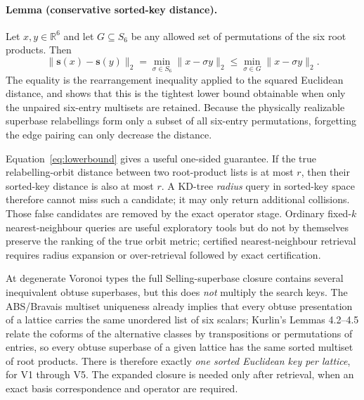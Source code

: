 \documentclass[11pt]{article}
\newcommand{\sortkey}{\mathbf{s}}
\begin{document}
\paragraph{Lemma (conservative sorted-key distance).}
Let $x,y\in\mathbb R^6$ and let $G\subseteq S_6$ be any allowed set of permutations of the six root products. Then
\begin{equation}
\label{eq:lowerbound}
\|\sortkey(x)-\sortkey(y)\|_2
=\min_{\sigma\in S_6}\|x-\sigma y\|_2
\leq \min_{\sigma\in G}\|x-\sigma y\|_2.
\end{equation}
The equality is the rearrangement inequality applied to the squared Euclidean distance, and shows that this is the tightest lower bound obtainable when only the unpaired six-entry multisets are retained. Because the physically realizable superbase relabellings form only a subset of all six-entry permutations, forgetting the edge pairing can only decrease the distance.

Equation~\eqref{eq:lowerbound} gives a useful one-sided guarantee. If the true relabelling-orbit distance between two root-product lists is at most $r$, then their sorted-key distance is also at most $r$. A KD-tree \emph{radius} query in sorted-key space therefore cannot miss such a candidate; it may only return additional collisions. Those false candidates are removed by the exact operator stage. Ordinary fixed-$k$ nearest-neighbour queries are useful exploratory tools but do not by themselves preserve the ranking of the true orbit metric; certified nearest-neighbour retrieval requires radius expansion or over-retrieval followed by exact certification.

At degenerate Voronoi types the full Selling-superbase closure contains several inequivalent obtuse superbases, but this does \emph{not} multiply the search keys. The ABS/Bravais multiset uniqueness already implies that every obtuse presentation of a lattice carries the same unordered list of six scalars; Kurlin's Lemmas 4.2--4.5 relate the coforms of the alternative classes by transpositions or permutations of entries, so every obtuse superbase of a given lattice has the same sorted multiset of root products. There is therefore exactly \emph{one sorted Euclidean key per lattice}, for V1 through V5. The expanded closure is needed only after retrieval, when an exact basis correspondence and operator are required.
\end{document}
